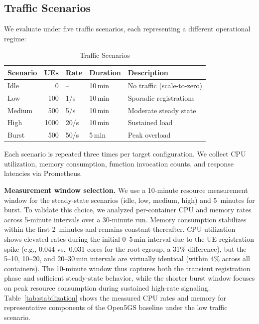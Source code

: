 \subsection{Traffic Scenarios}

We evaluate under five traffic scenarios, each representing a different operational regime:

\begin{table}[t]
\centering
\caption{Traffic Scenarios}
\label{tab:scenarios}
\small
\begin{tabular}{@{}lrlll@{}}
\toprule
\textbf{Scenario} & \textbf{UEs} & \textbf{Rate} & \textbf{Duration} & \textbf{Description} \\
\midrule
Idle   & 0    & --       & 10\,min & No traffic (scale-to-zero) \\
Low    & 100  & 1/s      & 10\,min & Sporadic registrations \\
Medium & 500  & 5/s      & 10\,min & Moderate steady state \\
High   & 1000 & 20/s     & 10\,min & Sustained load \\
Burst  & 500  & 50/s     & 5\,min  & Peak overload \\
\bottomrule
\end{tabular}
\end{table}

Each scenario is repeated three times per target configuration. We collect CPU utilization, memory consumption, function invocation counts, and response latencies via Prometheus.

\textbf{Measurement window selection.} We use a 10-minute resource measurement window for the steady-state scenarios (idle, low, medium, high) and 5~minutes for burst. To validate this choice, we analyzed per-container CPU and memory rates across 5-minute intervals over a 30-minute run. Memory consumption stabilizes within the first 2~minutes and remains constant thereafter. CPU utilization shows elevated rates during the initial 0--5\,min interval due to the UE registration spike (e.g., 0.044 vs.\ 0.031 cores for the root cgroup, a 31\% difference), but the 5--10, 10--20, and 20--30\,min intervals are virtually identical (within 4\% across all containers). The 10-minute window thus captures both the transient registration phase and sufficient steady-state behavior, while the shorter burst window focuses on peak resource consumption during sustained high-rate signaling. Table~\ref{tab:stabilization} shows the measured CPU rates and memory for representative components of the Open5GS baseline under the low traffic scenario.


